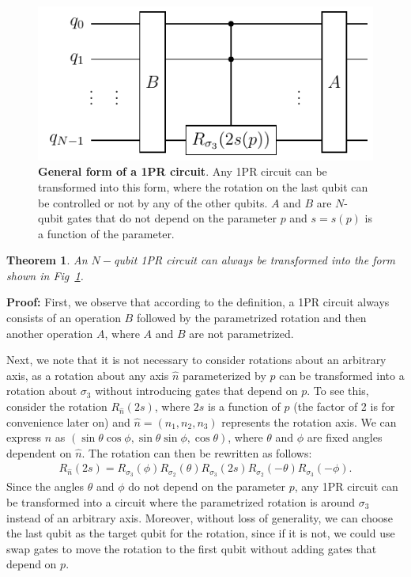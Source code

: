 \documentclass[10pt,letterpaper]{article} %
\newcommand{\fref}[1]{Fig~\ref{#1}}
\newtheorem{theorem}{Theorem}
\begin{document}
\begin{figure} %
\centering
\includegraphics{OPR-circuit.pdf}
\caption{\textbf{General form of a 1PR circuit}.
Any 1PR circuit can be transformed into this form,
where the rotation on the last qubit
can be controlled or not by any of the other qubits.
$A$ and $B$
are $N$-qubit gates that do not depend on the parameter $p$ and
$s= s(p)$ is a function of the parameter.}
\label{Fig4}
\end{figure} %

\begin{theorem}
An $N-$qubit 1PR circuit can always be transformed 
into the form shown in \fref{Fig4}.
\end{theorem}
\textbf{Proof:} 
First, we observe that according to the
definition, a 1PR circuit always consists of an operation $B$ followed 
by the parametrized rotation and then another operation $A$, 
where $A$ and $B$ are not parametrized.

Next, we note that it is not necessary to consider rotations about an arbitrary axis,
as a rotation about any axis $\hat{n}$ parameterized by $p$
can be transformed into a rotation about $\sigma_3$ without introducing 
gates that depend on $p$. To see this, consider the rotation $R_{\hat{n}}(2s)$, where $2s$ 
is a function of $p$ (the factor of 2 is for convenience later on) 
and $\hat{n} = (n_1,n_2,n_3)$ represents the rotation axis. 
We can express $\hat{n}$ as $(\sin \theta \cos \phi, \sin \theta \sin \phi, \cos \theta)$, 
where $\theta$ and $\phi$ are fixed angles dependent on $\hat{n}$. 
The rotation can then be rewritten as follows:
\begin{eqnarray}
R_{\hat{n}}(2s) = R_{\sigma_3}(\phi) R_{\sigma_2}(\theta) R_{\sigma_3}(2s) R_{\sigma_2}(-\theta) R_{\sigma_3}(-\phi).
\end{eqnarray}
Since the angles $\theta$ and $\phi$ do not depend on the parameter $p$,
any 1PR circuit can be transformed into a circuit where the parametrized
 rotation is around $\sigma_3$ instead of an arbitrary axis. 
Moreover, without loss of generality, we can choose the last qubit as the
target qubit for the rotation, since if it is not, we could use
swap gates to move the rotation
to the first qubit without adding gates
that depend on $p$. 
\end{document}

